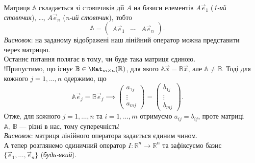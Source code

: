 \documentclass{math_library}
\begin{document}
	Матриця $\mathbb{A}$ складається зі стовпчиків дії $A$ на базиси елементів $A\vec{e}_1$ (\textit{1-ий стовпчик}), \dots, $A\vec{e}_n$ (\textit{n-ий стовпчик}), тобто 
	\[
	\mathbb{A} = \begin{pmatrix} A\vec{e}_1 & \cdots & A\vec{e}_n \end{pmatrix}.
	\]
	\textit{Висновок}: на заданому відображені наш лінійний оператор можна представити через матрицю.
	\bigskip \\
	Останнє питання полягає в тому, чи буде така матриця єдиною.\\
	!Припустимо, що існує $\mathbb{B} \in \Mat_{m \times n}(\mathbb{R})$, для якого $\mathbb{A} \vec{x} = \mathbb{B} \vec{x}$, але $\mathbb{A} \neq \mathbb{B}$. Тоді для кожного $j = 1,\dots,n$ одержимо, що
	\[
	\mathbb{A} \vec{e}_j = \mathbb{B} \vec{e}_j \implies \begin{pmatrix} a_{1j} \\ \vdots \\ a_{mj} \end{pmatrix} = \begin{pmatrix} b_{1j} \\ \vdots \\ b_{mj} \end{pmatrix}.
	\]
	Отже, для кожного $j = 1,\dots,n$ та $i = 1,\dots,m$ отримуємо $a_{ij} = b_{ij}$, проте матриці $\mathbb{A},\ \mathbb{B}$ --- різні в нас, тому суперечність!\\
	\textit{Висновок}: матриця лінійного оператора задається єдиним чином.
	\bigskip \\

	А тепер розглянемо одиничний оператор $I \colon \mathbb{R}^n \to \mathbb{R}^n$ та зафіксуємо базис $\{\vec{e}_1, \dots, \vec{e}_n\}$ (\textit{будь-який}).
\end{document}
